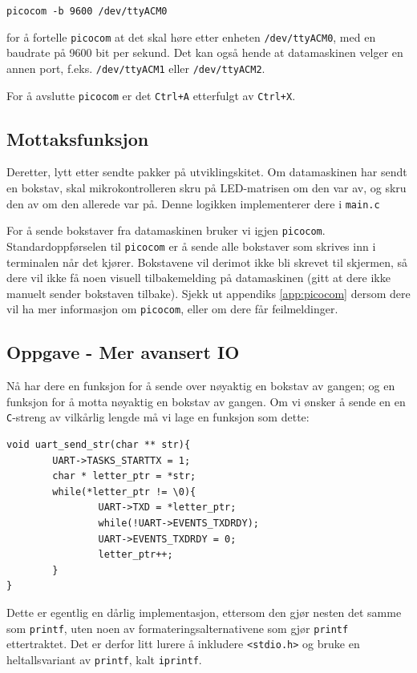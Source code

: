 \verb|picocom -b 9600 /dev/ttyACM0|

for å fortelle \verb|picocom| at det skal høre etter enheten \verb|/dev/ttyACM0|, med en baudrate på 9600 bit per sekund. Det kan også hende at datamaskinen velger en annen port, f.eks. \verb|/dev/ttyACM1| eller \verb|/dev/ttyACM2|. 

For å avslutte \verb|picocom| er det \verb|Ctrl+A| etterfulgt av \verb|Ctrl+X|.

\subsection{Mottaksfunksjon}
Deretter, lytt etter sendte pakker på utviklingskitet. Om datamaskinen har sendt en bokstav, skal mikrokontrolleren skru på LED-matrisen om den var av, og skru den av om den allerede var på. Denne logikken implementerer dere i \verb|main.c|

For å sende bokstaver fra datamaskinen bruker vi igjen \verb|picocom|. Standardoppførselen til \verb|picocom| er å sende alle bokstaver som skrives inn i terminalen når det kjører. Bokstavene vil derimot ikke bli skrevet til skjermen, så dere vil ikke få noen visuell tilbakemelding på datamaskinen (gitt at dere ikke manuelt sender bokstaven tilbake). Sjekk ut appendiks \ref{app:picocom} dersom dere vil ha mer informasjon om \verb|picocom|, eller om dere får feilmeldinger.


\subsection{Oppgave - Mer avansert IO}

Nå har dere en funksjon for å sende over nøyaktig en bokstav av gangen; og en funksjon for å motta nøyaktig en bokstav av gangen. Om vi ønsker å sende en en \verb|C|-streng av vilkårlig lengde må vi lage en funksjon som dette:

\begin{lstlisting}
void uart_send_str(char ** str){
        UART->TASKS_STARTTX = 1;
        char * letter_ptr = *str;
        while(*letter_ptr != \0){
                UART->TXD = *letter_ptr;
                while(!UART->EVENTS_TXDRDY);
                UART->EVENTS_TXDRDY = 0;
                letter_ptr++;
        }
}
\end{lstlisting}


Dette er egentlig en dårlig implementasjon, ettersom den gjør nesten det samme som \verb|printf|, uten noen av formateringsalternativene som gjør \verb|printf| ettertraktet. Det er derfor litt lurere å inkludere \verb|<stdio.h>| og bruke en heltallsvariant av \verb|printf|, kalt \verb|iprintf|.

